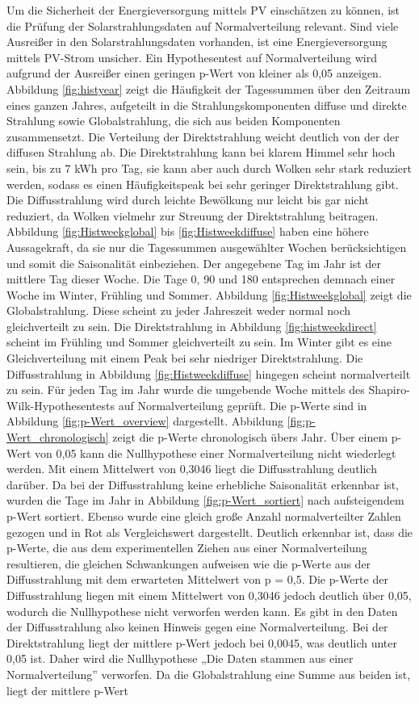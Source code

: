 Um die Sicherheit der Energieversorgung mittels PV einschätzen zu können, ist die Prüfung der Solarstrahlungsdaten auf Normalverteilung relevant. Sind viele Ausreißer in den Solarstrahlungsdaten vorhanden, ist eine Energieversorgung mittels PV-Strom unsicher. Ein Hypothesentest auf Normalverteilung wird aufgrund der Ausreißer einen geringen p-Wert von kleiner als 0,05 anzeigen. Abbildung \ref{fig:histyear} zeigt die Häufigkeit der Tagessummen über den Zeitraum eines ganzen Jahres, aufgeteilt in die Strahlungskomponenten diffuse und direkte Strahlung sowie Globalstrahlung, die sich aus beiden Komponenten zusammensetzt. Die Verteilung der Direktstrahlung weicht deutlich von der der diffusen Strahlung ab. Die Direktstrahlung kann bei klarem Himmel sehr hoch sein, bis zu 7 kWh pro Tag, sie kann aber auch durch Wolken sehr stark reduziert werden, sodass es einen Häufigkeitspeak bei sehr geringer Direktstrahlung gibt. Die Diffusstrahlung wird durch leichte Bewölkung nur leicht bis gar nicht reduziert, da Wolken vielmehr zur Streuung der Direktstrahlung beitragen. Abbildung \ref{fig:Histweekglobal} bis \ref{fig:Histweekdiffuse} haben eine höhere Aussagekraft, da sie nur die Tagessummen ausgewählter Wochen berücksichtigen und somit die Saisonalität einbeziehen. Der angegebene Tag im Jahr ist der mittlere Tag dieser Woche. Die Tage 0, 90 und 180 entsprechen demnach einer Woche im Winter, Frühling und Sommer. Abbildung \ref{fig:Histweekglobal} zeigt die Globalstrahlung. Diese scheint zu jeder Jahreszeit weder normal noch gleichverteilt zu sein. Die Direktstrahlung in Abbildung \ref{fig:histweekdirect} scheint im Frühling und Sommer gleichverteilt zu sein. Im Winter gibt es eine Gleichverteilung mit einem Peak bei sehr niedriger Direktstrahlung. Die Diffusstrahlung in Abbildung \ref{fig:Histweekdiffuse} hingegen scheint normalverteilt zu sein. Für jeden Tag im Jahr wurde die umgebende Woche mittels des Shapiro-Wilk-Hypothesentests auf Normalverteilung geprüft. Die p-Werte sind in Abbildung \ref{fig:p-Wert_overview} dargestellt. Abbildung \ref{fig:p-Wert_chronologisch} zeigt die p-Werte chronologisch übers Jahr. Über einem p-Wert von 0,05 kann die Nullhypothese einer Normalverteilung nicht wiederlegt werden. Mit einem Mittelwert von 0,3046 liegt die Diffusstrahlung deutlich darüber. Da bei der Diffusstrahlung keine erhebliche Saisonalität erkennbar ist, wurden die Tage im Jahr in Abbildung \ref{fig:p-Wert_sortiert} nach aufsteigendem p-Wert sortiert. Ebenso wurde eine gleich große Anzahl normalverteilter Zahlen gezogen und in Rot als Vergleichswert dargestellt. Deutlich erkennbar ist, dass die p-Werte, die aus dem experimentellen Ziehen aus einer Normalverteilung resultieren, die gleichen Schwankungen aufweisen wie die p-Werte aus der Diffusstrahlung mit dem erwarteten Mittelwert von p = 0,5. Die p-Werte der Diffusstrahlung liegen mit einem Mittelwert von 0,3046 jedoch deutlich über 0,05, wodurch die Nullhypothese nicht verworfen werden kann. Es gibt in den Daten der Diffusstrahlung also keinen Hinweis gegen eine Normalverteilung. Bei der Direktstrahlung liegt der mittlere p-Wert jedoch bei 0,0045, was deutlich unter 0,05 ist. Daher wird die Nullhypothese „Die Daten stammen aus einer Normalverteilung” verworfen. Da die Globalstrahlung eine Summe aus beiden ist, liegt der mittlere p-Wert 